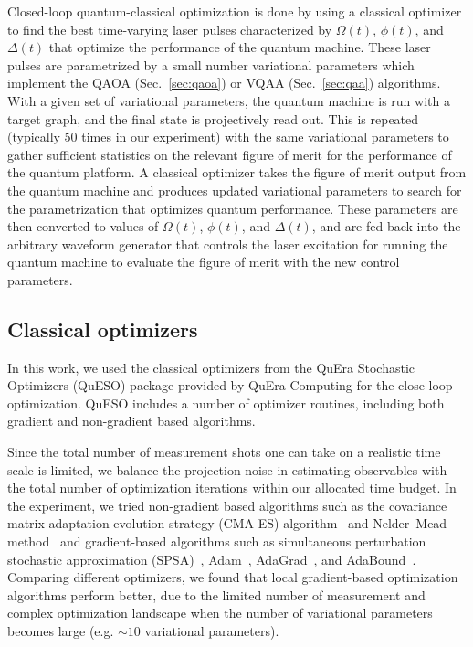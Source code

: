 \documentclass[twocolumn,amssymb,secnumarabic, prl, aps, nofootinbib]{revtex4-1}
\begin{document}
Closed-loop quantum-classical optimization is done by using a classical optimizer to find the best time-varying laser pulses characterized by $\Omega(t)$, $\phi(t)$, and $\Delta(t)$ that optimize the performance of the quantum machine. These laser pulses are parametrized by a small number variational parameters which implement the QAOA (Sec.~\ref{sec:qaoa}) or VQAA (Sec.~\ref{sec:qaa}) algorithms.  With a given set of variational parameters, the quantum machine is run with a target graph, and the final state is projectively read out. This is repeated (typically 50 times in our experiment) with the same variational parameters to gather sufficient statistics on the relevant figure of merit for the performance of the quantum platform. A classical optimizer takes the figure of merit output from the quantum machine and produces updated variational parameters to search for the parametrization that optimizes quantum performance. These parameters are then converted to values of $\Omega(t)$, $\phi(t)$, and $\Delta(t)$, and are fed back into the arbitrary waveform generator that controls the laser excitation for running the quantum machine to evaluate the figure of merit with the new control parameters.

\subsection{Classical optimizers}

In this work, we used the classical optimizers from the QuEra Stochastic Optimizers (QuESO) package provided by QuEra Computing for the close-loop optimization. QuESO includes a number of optimizer routines, including both gradient and non-gradient based algorithms. 

Since the total number of measurement shots one can take on a realistic time scale is limited, we balance the projection noise in estimating observables with the total number of optimization iterations within our allocated time budget. In the experiment, we tried non-gradient based algorithms such as the covariance matrix adaptation evolution strategy (CMA-ES) algorithm~\cite{hansen_cma_2006} and Nelder–Mead method~\cite{nelder_mead_1965} and gradient-based algorithms such as simultaneous perturbation stochastic approximation (SPSA)~\cite{spall_multivariate_1992}, Adam~\cite{kingma_adam_2017}, AdaGrad~\cite{duchi_adaptive_2011}, and AdaBound~\cite{luo_adaptive_2019}. Comparing different optimizers, we found that local gradient-based optimization algorithms perform better, due to the limited number of measurement and complex optimization landscape when the number of variational parameters becomes large (e.g. $\sim10$ variational parameters).
\end{document}

